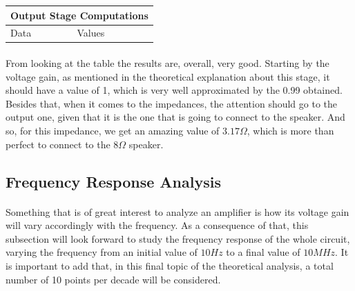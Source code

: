 \begin{table}[H]
\centering
\begin{tabular}{|l|l|} 
\hline
\multicolumn{2}{|l|}{\textbf{Output Stage Computations}}  \\ 
\hline
Data             & Values                               \\ 
\hline
        
\end{tabular}
\end{table}

\paragraph{}From looking at the table the results are, overall, very good. Starting by the voltage gain, as mentioned in the theoretical explanation about this stage, it should have a value of 1, which is very well approximated by the 0.99 obtained. Besides that, when it comes to the impedances, the attention should go to the output one, given that it is the one that is going to connect to the speaker. And so, for this impedance, we get an amazing value of $3.17 \Omega$, which is more than perfect to connect to the $8\Omega$ speaker.






\subsection{Frequency Response Analysis}

\paragraph{}Something that is of great interest to analyze an amplifier is how its voltage gain will vary accordingly with the frequency. As a consequence of that, this subsection will look forward to study the frequency response of the whole circuit, varying the frequency from an initial value of $10 Hz$ to a final value of $10 MHz$. It is important to add that, in this final topic of the theoretical analysis, a total number of 10 points per decade will be considered.
